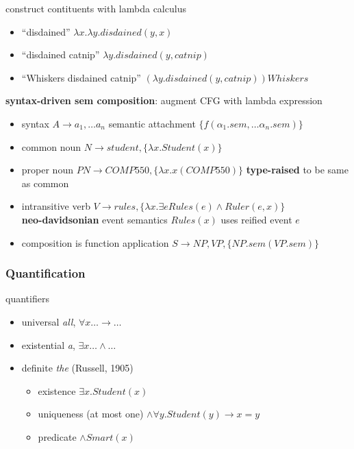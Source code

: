 \documentclass[]{article}
\theoremstyle{definition}
\begin{document}
construct contituents with lambda calculus
\begin{itemize}
    \item ``disdained'' $\lambda x.\lambda y. disdained(y,x)$
    \item ``disdained catnip'' $\lambda y. disdained(y, catnip)$
    \item ``Whiskers disdained catnip'' $(\lambda y. disdained(y, catnip))Whiskers$
\end{itemize}

\textbf{syntax-driven sem composition}: augment CFG with lambda expression
\begin{itemize}
    \item syntax $A \to a_1, \ldots a_n$ semantic attachment $\{f(\alpha_1.sem, \ldots \alpha_n.sem)\}$
    \item common noun $N \to student, \{ \lambda x.Student(x)\}$
    \item proper noun $PN \to COMP550, \{\lambda x.x(COMP550)\}$ \textbf{type-raised} to be same as common
    \item intransitive verb $V \to rules, \{ \lambda x. \exists e Rules(e) \wedge Ruler(e,x) \}$ \\
        \textbf{neo-davidsonian} event semantics $Rules(x)$ uses reified event $e$
    \item composition is function application $S \to NP, VP, \{NP.sem(VP.sem)\} $
\end{itemize}

\subsubsection{Quantification}%
\label{sub:quantification}

quantifiers
\begin{itemize}
    \item universal \textit{all}, $\forall x \ldots \to \ldots$
    \item existential \textit{a}, $\exists x \ldots \wedge \ldots$
    \item definite \textit{the} (Russell, 1905)
        \begin{itemize}
            \item existence $\exists x.Student(x)$
            \item uniqueness (at most one) $\wedge \forall y.Student(y) \to x = y$
            \item predicate $\wedge Smart(x)$
        \end{itemize}
\end{itemize}
\end{document}
